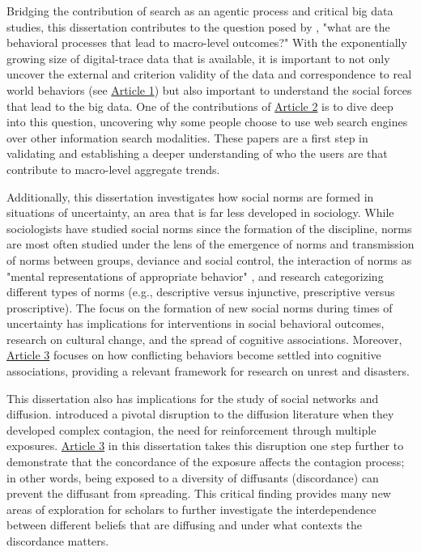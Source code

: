 Bridging the contribution of search as an agentic process 
and critical big data studies, this dissertation contributes to the question posed by 
\citet{breigerScaling2015}, "what are the behavioral processes that 
lead to macro-level outcomes?" With the exponentially growing size of digital-trace data
that is available, it is important to not only uncover the external and criterion validity of 
the data and correspondence to real world behaviors (see \hyperlink{paper-1}{Article 1})
but also important to understand the social forces that lead to the big data. 
One of the contributions of \hyperlink{paper-2}{Article 2} is to dive deep
into this question, uncovering why some people choose to use web search engines over other
information search modalities. These papers are a first step in validating and establishing
a deeper understanding of who the users are that contribute to macro-level aggregate trends. 

Additionally, this dissertation investigates how social norms are
formed in situations of uncertainty, an area that is far less developed in
sociology. While sociologists have studied social norms since the
formation of the discipline, norms are most often studied under the lens
of the emergence of norms and transmission of norms between groups, 
deviance and social control, the interaction of norms as "mental 
representations of appropriate behavior" \citep{aarts2003silence}, 
and research categorizing different types of norms (e.g., descriptive 
versus injunctive, prescriptive versus proscriptive).  
The focus on the formation of new social norms during times of uncertainty
has implications for interventions in social behavioral outcomes, 
research on cultural change, and the spread of cognitive associations. 
Moreover, \hyperlink{paper-3}{Article 3} focuses on how conflicting
behaviors become settled into cognitive associations, providing
a relevant framework for research on unrest and disasters.

This dissertation also has implications for the study of social
networks and diffusion. \citet{centolaComplexContagionsWeakness2007}
introduced a pivotal disruption to the diffusion literature when
they developed complex contagion, the need for reinforcement through multiple
exposures.  \hyperlink{paper-3}{Article 3} in this dissertation
takes this disruption one step further to demonstrate that the concordance
of the exposure affects the contagion process; in other words, being exposed to a 
diversity of diffusants (discordance) can prevent the diffusant from spreading. 
This critical finding provides many new areas of exploration for scholars 
to further investigate the interdependence between different beliefs that
are diffusing and under what contexts the discordance matters. 

